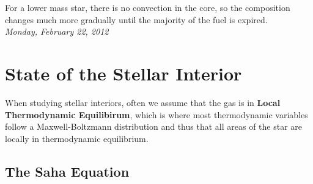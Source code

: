 \documentclass[10pt]{article}
\numberwithin{equation}{section}
\newcommand{\n}{\noindent}
\begin{document}
    \n For a lower mass star, there is no convection in the core, so
    the composition changes much more gradually until the majority of
    the fuel is expired.\\

    \n \textit{Monday, February 22, 2012}

    \section{State of the Stellar Interior}
    \label{sec:state-stell-inter}

    When studying stellar interiors, often we assume that the gas is
    in \textbf{Local Thermodynamic Equilibirum}, which is where most
    thermodynamic variables follow a Maxwell-Boltzmann distribution
    and thus that all areas of the star are locally in thermodynamic
    equilibrium.

    \subsection{The Saha Equation}
    \label{sec:saha-equation}
 
\end{document}
